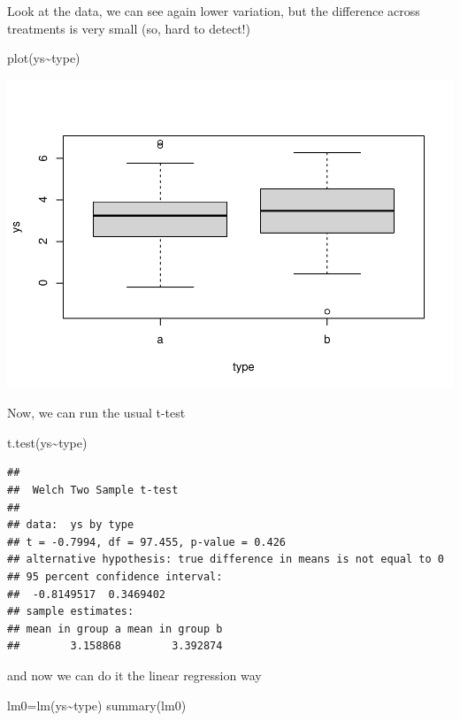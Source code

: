 \documentclass[
]{book}
\newenvironment{Shaded}{\begin{snugshade}}{\end{snugshade}}
\newcommand{\FunctionTok}[1]{\textcolor[rgb]{0.00,0.00,0.00}{#1}}
\newcommand{\NormalTok}[1]{#1}
\newcommand{\OtherTok}[1]{\textcolor[rgb]{0.56,0.35,0.01}{#1}}
\newcommand{\SpecialCharTok}[1]{\textcolor[rgb]{0.00,0.00,0.00}{#1}}
\begin{document}
Look at the data, we can see again lower variation, but the difference across treatments is very small (so, hard to detect!)

\begin{Shaded}
\begin{Highlighting}[]
\FunctionTok{plot}\NormalTok{(ys}\SpecialCharTok{\textasciitilde{}}\NormalTok{type)}
\end{Highlighting}
\end{Shaded}

\includegraphics{ECOMODbook_files/figure-latex/a8.16-1.pdf}

Now, we can run the usual t-test

\begin{Shaded}
\begin{Highlighting}[]
\FunctionTok{t.test}\NormalTok{(ys}\SpecialCharTok{\textasciitilde{}}\NormalTok{type)}
\end{Highlighting}
\end{Shaded}

\begin{verbatim}
## 
##  Welch Two Sample t-test
## 
## data:  ys by type
## t = -0.7994, df = 97.455, p-value = 0.426
## alternative hypothesis: true difference in means is not equal to 0
## 95 percent confidence interval:
##  -0.8149517  0.3469402
## sample estimates:
## mean in group a mean in group b 
##        3.158868        3.392874
\end{verbatim}

and now we can do it the linear regression way

\begin{Shaded}
\begin{Highlighting}[]
\NormalTok{lm0}\OtherTok{=}\FunctionTok{lm}\NormalTok{(ys}\SpecialCharTok{\textasciitilde{}}\NormalTok{type)}
\FunctionTok{summary}\NormalTok{(lm0)}
\end{Highlighting}
\end{Shaded}
\end{document}
